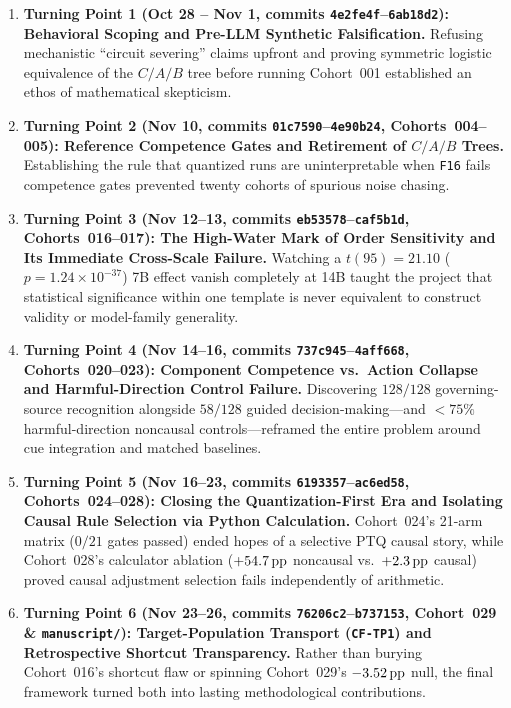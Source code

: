 \begin{enumerate}
  \item \textbf{Turning Point 1 (Oct 28 -- Nov 1, commits \texttt{4e2fe4f}--\texttt{6ab18d2}): Behavioral Scoping and Pre-LLM Synthetic Falsification.} Refusing mechanistic ``circuit severing'' claims upfront and proving symmetric logistic equivalence of the $C/A/B$ tree before running Cohort~001 established an ethos of mathematical skepticism.
  \item \textbf{Turning Point 2 (Nov 10, commits \texttt{01c7590}--\texttt{4e90b24}, Cohorts~004--005): Reference Competence Gates and Retirement of $C/A/B$ Trees.} Establishing the rule that quantized runs are uninterpretable when \texttt{F16} fails competence gates prevented twenty cohorts of spurious noise chasing.
  \item \textbf{Turning Point 3 (Nov 12--13, commits \texttt{eb53578}--\texttt{caf5b1d}, Cohorts~016--017): The High-Water Mark of Order Sensitivity and Its Immediate Cross-Scale Failure.} Watching a $t(95)=21.10$ ($p=1.24\times 10^{-37}$) 7B effect vanish completely at 14B taught the project that statistical significance within one template is never equivalent to construct validity or model-family generality.
  \item \textbf{Turning Point 4 (Nov 14--16, commits \texttt{737c945}--\texttt{4aff668}, Cohorts~020--023): Component Competence vs.\ Action Collapse and Harmful-Direction Control Failure.} Discovering $128/128$ governing-source recognition alongside $58/128$ guided decision-making---and $<75\%$ harmful-direction noncausal controls---reframed the entire problem around cue integration and matched baselines.
  \item \textbf{Turning Point 5 (Nov 16--23, commits \texttt{6193357}--\texttt{ac6ed58}, Cohorts~024--028): Closing the Quantization-First Era and Isolating Causal Rule Selection via Python Calculation.} Cohort~024's 21-arm matrix ($0/21$ gates passed) ended hopes of a selective PTQ causal story, while Cohort~028's calculator ablation ($+54.7\,\mathrm{pp}$ noncausal vs.\ $+2.3\,\mathrm{pp}$ causal) proved causal adjustment selection fails independently of arithmetic.
  \item \textbf{Turning Point 6 (Nov 23--26, commits \texttt{76206c2}--\texttt{b737153}, Cohort~029 \& \texttt{manuscript/}): Target-Population Transport (\texttt{CF-TP1}) and Retrospective Shortcut Transparency.} Rather than burying Cohort~016's shortcut flaw or spinning Cohort~029's $-3.52\,\mathrm{pp}$ null, the final framework turned both into lasting methodological contributions.
\end{enumerate}
